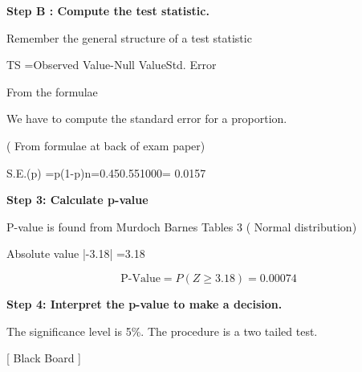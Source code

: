\noindent \textbf{Step B : Compute the test statistic.}

Remember the general structure of a test statistic

TS =Observed Value-Null ValueStd. Error 



From the formulae

We have to compute the standard error for a proportion. 

( From formulae at back of exam paper)

S.E.(p) =p(1-p)n=0.450.551000= 0.0157




\noindent \textbf{Step 3: Calculate p-value}

P-value is found from Murdoch Barnes Tables 3 ( Normal distribution)

Absolute value  |-3.18| =3.18




\[ \mbox{P-Value} = P(Z \geq 3.18) = 0.00074\]


\noindent \textbf{Step 4: Interpret the p-value to make a decision.}

The significance level is 5\%.  The procedure is a two tailed test.


[ Black Board ]



